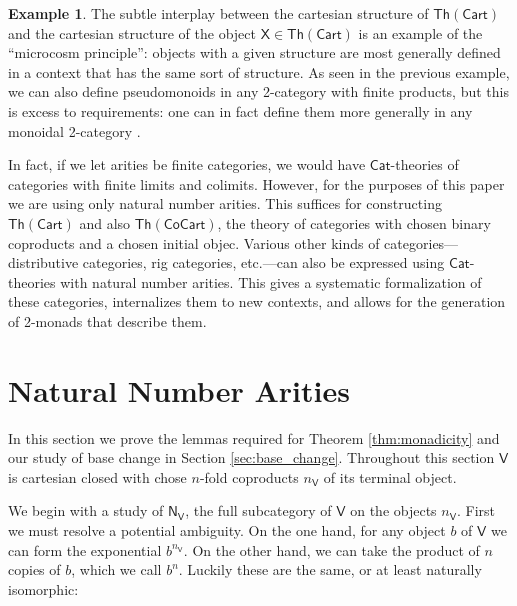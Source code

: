 \documentclass{amsart}
\theoremstyle{definition}
\newtheorem{example}[theorem]{Example}
\newcommand{\Th}{\mathsf{Th}}
\newcommand{\Cat}{\mathsf{Cat}}
\newcommand{\NN}{\mathsf{N}}
\newcommand{\V}{\mathsf{V}}
\newcommand{\X}{\mathsf{X}}
\begin{document}
\begin{example}
The subtle interplay between the cartesian structure of $\Th(\mathsf{Cart})$ and the cartesian structure of the object $\X \in \Th(\mathsf{Cart})$ is an example of the ``microcosm principle'': objects with a given structure are most generally defined in a context that has the same sort of structure.   As seen in the previous example, we can also define pseudomonoids in any 2-category with finite products, but this is excess to requirements: one can in 
fact define them more generally in any monoidal 2-category \cite{pseudo}.

In fact, if we let arities be finite categories, we would have $\Cat$-theories of categories with finite limits and colimits.   However, for the purposes of this paper we are using only natural number arities.  This suffices for constructing $\Th(\mathsf{Cart})$ and also $\Th(\mathsf{CoCart})$, the theory of categories with chosen binary coproducts and a chosen initial objec.   Various other kinds of categories---distributive categories, rig categories, etc.---can also be expressed using $\Cat$-theories with natural number arities. This gives a systematic formalization of these categories, internalizes them to new contexts, and allows for the generation of 2-monads that describe them.
\end{example}

\section{Natural Number Arities}

In this section we prove the lemmas required for Theorem \ref{thm:monadicity} and
our study of base change in Section \ref{sec:base_change}.  Throughout this section $\V$ is cartesian closed with chose $n$-fold coproducts $n_\V$ of its terminal object. 

We begin with a study of $\NN_\V$, the full subcategory of $\V$ on the objects $n_\V$.
First we must resolve a potential ambiguity.  On the one hand,
for any object $b$ of $\V$ we can form the exponential $b^{n_\V}$.   On the 
other hand, we can take the product of $n$ copies of $b$, which we call $b^n$.    
Luckily these are the same, or at least naturally isomorphic:
\end{document}
